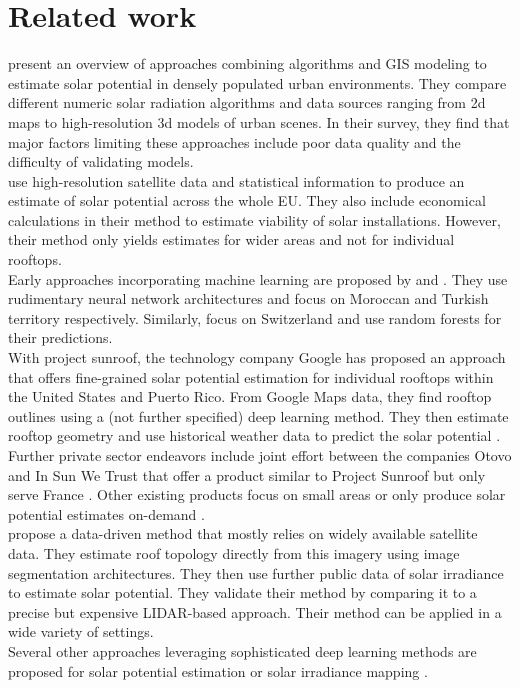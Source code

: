 \documentclass{article} %
\begin{document}
\section*{Related work}
\citet{freitas2015modelling} present an overview of approaches combining algorithms and GIS modeling to estimate solar potential in densely populated urban environments. They compare different numeric solar radiation algorithms and data sources ranging from 2d maps to high-resolution 3d models of urban scenes. In their survey, they find that major factors limiting these approaches include poor data quality and the difficulty of validating models.\\
\cite{bodis2019high} use high-resolution satellite data and statistical information to produce an estimate of solar potential across the whole EU. They also include economical calculations in their method to estimate viability of solar installations. However, their method only yields estimates for wider areas and not for individual rooftops.\\
Early approaches incorporating machine learning are proposed by \citet{ouammi2012artificial} and \citet{sozen2004use}. They use rudimentary neural network architectures and focus on Moroccan and Turkish territory respectively. Similarly, \citet{assouline2018large} focus on Switzerland and use random forests for their predictions.\\
With project sunroof, the technology company Google has proposed an approach that offers fine-grained solar potential estimation for individual rooftops within the United States and Puerto Rico. From Google Maps data, they find rooftop outlines using a (not further specified) deep learning method. They then estimate rooftop geometry and use historical weather data to predict the solar potential \cite{sunroof}.\\
Further private sector endeavors include joint effort between the companies Otovo and In Sun We Trust that offer a product similar to Project Sunroof but only serve France \cite{insun}. Other existing products focus on small areas or only produce solar potential estimates on-demand \cite{insun, rhino}.\\
\citet{lee2019deeproof} propose a data-driven method that mostly relies on widely available satellite data. They estimate roof topology directly from this imagery using image segmentation architectures. They then use further public data of solar irradiance to estimate solar potential. They validate their method by comparing it to a precise but expensive LIDAR-based approach. Their method can be applied in a wide variety of settings.\\
Several other approaches leveraging sophisticated deep learning methods are proposed for solar potential estimation \cite{huang2019urban, zhong2021city} or solar irradiance mapping \cite{kumari2021deep, chandola2020multi, bamisile2020application}.
\end{document}
